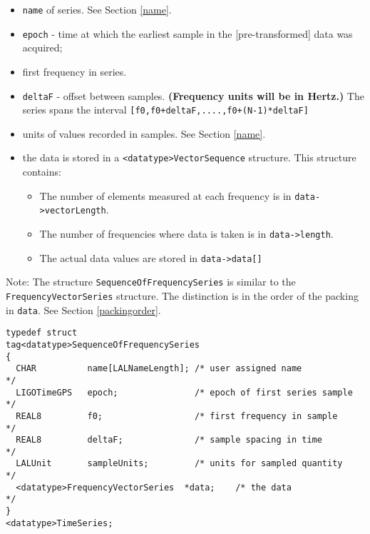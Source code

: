 \documentclass[]{ligodcc}
\begin{document}
\begin{itemize}
\vspace{-0.15in}
\item
{\tt name} of series. See Section \ref{name}.
\vspace{-0.15in}
\item
{\tt epoch}  -  time at which the earliest sample in the [pre-transformed]
data was acquired;
\vspace{-0.15in}
\item
first frequency in series. 
\vspace{-0.15in}
\item
{\tt deltaF}  -  offset between samples.  {\bf (Frequency units will be in Hertz.)}
The series spans the interval {\tt [f0,f0+deltaF,....,f0+(N-1)*deltaF]}
\vspace{-0.15in}
\item
units of values recorded in samples. See Section \ref{name}.
\vspace{-0.15in}
\item
the data is stored in a {\tt <datatype>VectorSequence}  
structure. This structure contains:
\begin{itemize}
\vspace{-0.10in}
\item
The number of elements measured at each frequency is in {\tt data->vectorLength}.
\vspace{-0.10in}
\item
The number of frequencies where  data is taken is in {\tt data->length}.
\vspace{-0.10in}
\item
The actual data  values are stored in {\tt data->data[]}
\end{itemize}
\end{itemize}

Note: The structure {\tt SequenceOfFrequencySeries} is similar to the
{\tt FrequencyVectorSeries} structure. The distinction is in the order of
the packing in {\tt *data}. See Section \ref{packingorder}.

{\footnotesize
\begin{verbatim}
typedef struct
tag<datatype>SequenceOfFrequencySeries
{
  CHAR          name[LALNameLength]; /* user assigned name           */
  LIGOTimeGPS   epoch;               /* epoch of first series sample */
  REAL8         f0;                  /* first frequency in sample    */
  REAL8         deltaF;              /* sample spacing in time       */
  LALUnit       sampleUnits;         /* units for sampled quantity   */
  <datatype>FrequencyVectorSeries  *data;    /* the data                     */
}
<datatype>TimeSeries;
\end{verbatim}}
\end{document}
